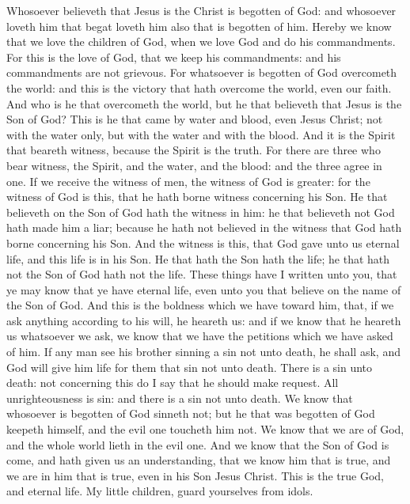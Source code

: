 Whosoever believeth that Jesus is the Christ is begotten of God: and whosoever loveth him that begat loveth him also that is begotten of him. Hereby we know that we love the children of God, when we love God and do his commandments. For this is the love of God, that we keep his commandments: and his commandments are not grievous. For whatsoever is begotten of God overcometh the world: and this is the victory that hath overcome the world, even our faith. And who is he that overcometh the world, but he that believeth that Jesus is the Son of God? This is he that came by water and blood, even Jesus Christ; not with the water only, but with the water and with the blood. And it is the Spirit that beareth witness, because the Spirit is the truth. For there are three who bear witness, the Spirit, and the water, and the blood: and the three agree in one. If we receive the witness of men, the witness of God is greater: for the witness of God is this, that he hath borne witness concerning his Son. He that believeth on the Son of God hath the witness in him: he that believeth not God hath made him a liar; because he hath not believed in the witness that God hath borne concerning his Son. And the witness is this, that God gave unto us eternal life, and this life is in his Son. He that hath the Son hath the life; he that hath not the Son of God hath not the life.  These things have I written unto you, that ye may know that ye have eternal life, even unto you that believe on the name of the Son of God. And this is the boldness which we have toward him, that, if we ask anything according to his will, he heareth us: and if we know that he heareth us whatsoever we ask, we know that we have the petitions which we have asked of him. If any man see his brother sinning a sin not unto death, he shall ask, and God will give him life for them that sin not unto death. There is a sin unto death: not concerning this do I say that he should make request. All unrighteousness is sin: and there is a sin not unto death.  We know that whosoever is begotten of God sinneth not; but he that was begotten of God keepeth himself, and the evil one toucheth him not. We know that we are of God, and the whole world lieth in the evil one. And we know that the Son of God is come, and hath given us an understanding, that we know him that is true, and we are in him that is true, even in his Son Jesus Christ. This is the true God, and eternal life. My little children, guard yourselves from idols. 